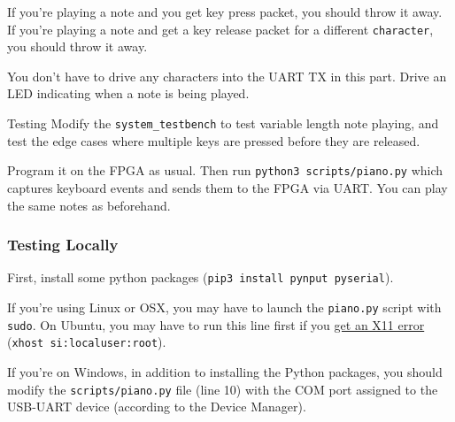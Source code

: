 \documentclass[11pt]{article}
\makeatletter
\renewcommand{\section}
{\@startsection {section}{1}{0pt}
 {-2ex}
 {1ex}
 {\bfseries\Large}}
\renewcommand{\subsection}
{\@startsection {subsection}{1}{0pt}
 {-1ex}
 {0.5ex}
 {\bfseries\normalsize}}
\makeatother
\begin{document}
If you're playing a note and you get key press packet, you should throw it away.
If you're playing a note and get a key release packet for a different \texttt{character}, you should throw it away.

You don't have to drive any characters into the UART TX in this part.
Drive an LED indicating when a note is being played.

\subsection{Testing}
Modify the \verb|system_testbench| to test variable length note playing, and test the edge cases where multiple keys are pressed before they are released.

Program it on the FPGA as usual.
Then run \verb|python3 scripts/piano.py| which captures keyboard events and sends them to the FPGA via UART.
You can play the same notes as beforehand.

\subsubsection{Testing Locally}
First, install some python packages (\verb|pip3 install pynput pyserial|).

If you're using Linux or OSX, you may have to launch the \verb|piano.py| script with \verb|sudo|.
On Ubuntu, you may have to run this line first if you \href{https://stackoverflow.com/questions/48833451/no-protocol-specified-when-running-a-sudo-su-app-on-ubuntu-linux}{get an X11 error} (\verb|xhost si:localuser:root|).

If you're on Windows, in addition to installing the Python packages, you should modify the \verb|scripts/piano.py| file (line 10) with the COM port assigned to the USB-UART device (according to the Device Manager).

\end{document}

